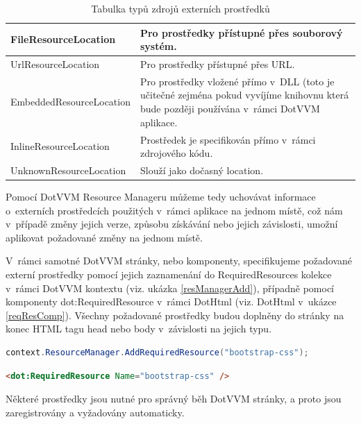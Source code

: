 \begin{table}[H]
	\caption{Tabulka typů zdrojů externích prostředků}
	\label{resLocTable}
	\centering
	\begin{tabular}{m{12em}|m{22em}}
		\toprule
FileResourceLocation           & Pro prostředky přístupné přes souborový systém. \\ \midrule
UrlResourceLocation           & Pro prostředky přístupné přes URL.\\ \midrule
EmbeddedResourceLocation           & Pro prostředky vložené přímo v~DLL (toto je učitečné zejména pokud vyvíjíme knihovnu která bude později používána v~rámci DotVVM aplikace. \\ \midrule
InlineResourceLocation           & Prostředek je specifikován přímo v~rámci zdrojového kódu. \\ \midrule
UnknownResourceLocation           & Slouží jako dočasný location. \\
\bottomrule
\end{tabular}
\end{table}
Pomocí DotVVM Resource Manageru můžeme tedy uchovávat informace o~externích prostředcích použitých v~rámci aplikace na jednom místě, což nám v~případě změny jejich verze, způsobu získávání nebo jejich závislosti, umožní aplikovat požadované změny na jednom místě.

V~rámci samotné DotVVM stránky, nebo komponenty, specifikujeme požadované externí prostředky pomocí jejich zaznamenání do RequiredResources kolekce v~rámci DotVVM kontextu (viz. ukázka \ref{resManagerAdd}), případně pomocí komponenty dot:RequiredResource v~rámci DotHtml (viz. DotHtml v~ukázce \ref{reqResComp}).
Všechny požadované prostředky budou doplněny do stránky na konec HTML tagu head nebo body v~závislosti na jejich typu.

\begin{lstlisting}[language=c#, caption=Specifikace požadovaného prostředku v~rámci C# kódu,label=resManagerAdd,captionpos=t]
context.ResourceManager.AddRequiredResource("bootstrap-css");

\end{lstlisting}

\begin{lstlisting}[language=Html, caption=Specifikace požadovaného prostředku v~rámci DotHtml,label=reqResComp,captionpos=t]
<dot:RequiredResource Name="bootstrap-css" />

\end{lstlisting}
Některé prostředky jsou nutné pro správný běh DotVVM stránky, a proto jsou zaregistrovány a vyžadovány automaticky.

